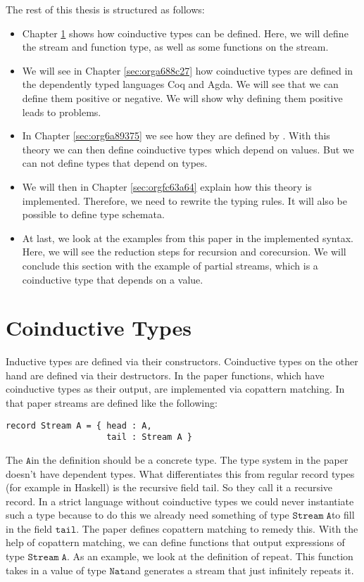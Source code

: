 \documentclass[a4paper,cleardoubleempty,BCOR1cm]{scrbook}
\begin{document}
The rest of this thesis is structured as follows:

\begin{itemize}
\item Chapter \ref{sec:orga25967b} shows how coinductive types can be defined.
Here, we will define the stream and function type, as well as some
functions on the stream.

\item We will see in Chapter \ref{sec:orga688c27} how
coinductive types are defined in the dependently typed languages Coq and Agda.
We will see that we can define them positive or negative. We will show why
defining them positive leads to problems.

\item In Chapter \ref{sec:org6a89375} we
see how they are defined by \cite{basold2016type}. With this theory we can then
define coinductive types which depend on values.  But we can not define types
that depend on types.

\item We will then in Chapter \ref{sec:orgfc63a64} explain how this theory is
implemented. Therefore, we need to rewrite the typing rules. It will also be
possible to define type schemata.

\item At last, we look at the examples from this paper \cite{basold2016type} in the implemented syntax.
Here, we will see the reduction steps for recursion and corecursion. We will
conclude this section with the example of partial streams, which is a
coinductive type that depends on a value.
\end{itemize}

\chapter{Coinductive Types}
\label{sec:orga25967b}
Inductive types are defined via their constructors.  Coinductive types on
the other hand are defined via their destructors.  In the paper \cite{abel2013copatterns}
functions, which have coinductive types as their output, are implemented via
copattern matching.  In that paper streams are defined like the following:

\begin{lstlisting}
record Stream A = { head : A,
                    tail : Stream A }
\end{lstlisting}

The $\mathtt{A}$\;in the definition should be a concrete type. The type system in the
paper doesn't have dependent types. What differentiates this from regular record
types (for example in Haskell) is the recursive field tail. So they call it a
recursive record. In a strict language without coinductive types we could never
instantiate such a type because to do this we already need something of type
$\mathtt{Stream\;A}$\;to fill in the field $\mathtt{tail}$. The paper defines
copattern matching to remedy this. With the help of copattern matching, we can define functions
that output expressions of type $\mathtt{Stream\;A}$. As an example, we look at the
definition of repeat. This function takes in a value of type $\mathtt{Nat}$\;and
generates a stream that just infinitely repeats it.
\end{document}
